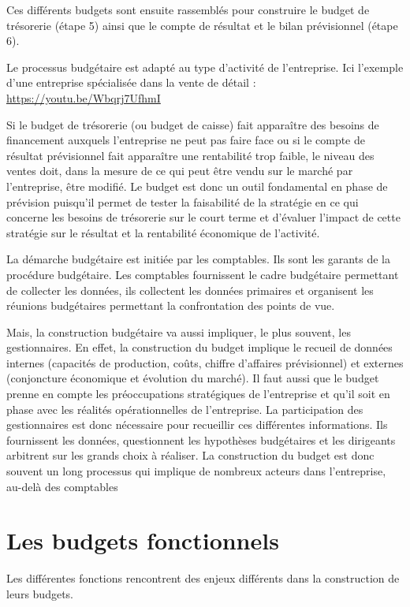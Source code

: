 \documentclass[oneside]{kaobook}
\begin{document}
Ces différents budgets sont ensuite rassemblés pour construire le budget de trésorerie (étape 5) ainsi que le compte de résultat et le bilan prévisionnel (étape 6).

\begin{kaobox}
Le processus budgétaire est adapté au type d'activité de l'entreprise. Ici l'exemple d'une entreprise spécialisée dans la vente de détail :
\url{https://youtu.be/Wbqrj7UfhmI}
\end{kaobox}

Si le budget de trésorerie (ou budget de caisse) fait apparaître des besoins de financement auxquels l'entreprise ne peut pas faire face ou si le compte de résultat prévisionnel fait apparaître une rentabilité trop faible, le niveau des ventes doit, dans la mesure de ce qui peut être vendu sur le marché par l'entreprise, être modifié. Le budget est donc un outil fondamental en phase de prévision puisqu'il permet de tester la faisabilité de la stratégie en ce qui concerne les besoins de trésorerie sur le court terme et d'évaluer l'impact de cette stratégie sur le résultat et la rentabilité économique de l'activité.

La démarche budgétaire est initiée par les comptables. Ils sont les garants de la procédure budgétaire. Les comptables fournissent le cadre budgétaire permettant de collecter les données, ils collectent les données primaires et organisent les réunions budgétaires permettant la confrontation des points de vue.

Mais, la construction budgétaire va aussi impliquer, le plus souvent, les gestionnaires. En effet, la construction du budget implique le recueil de données internes (capacités de production, coûts, chiffre d'affaires prévisionnel) et externes (conjoncture économique et évolution du marché). Il faut aussi que le budget prenne en compte les préoccupations stratégiques de l'entreprise et qu'il soit en phase avec les réalités opérationnelles de l'entreprise. La participation des gestionnaires est donc nécessaire pour recueillir ces différentes informations. Ils fournissent les données, questionnent les hypothèses budgétaires et les dirigeants arbitrent sur les grands choix à réaliser. 
La construction du budget est donc souvent un long processus qui implique de nombreux acteurs dans l'entreprise, au-delà des comptables

\section{Les budgets fonctionnels}
\label{sec:org48c810c}
Les différentes fonctions rencontrent des enjeux différents dans la construction de leurs budgets.
\end{document}
